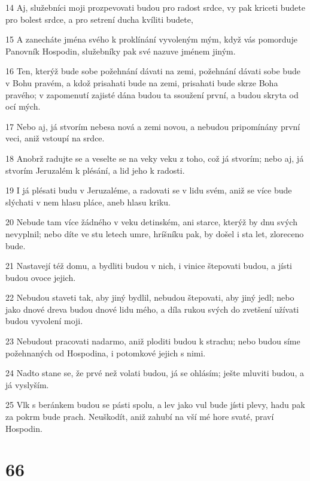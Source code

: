 \par 14 Aj, služebníci moji prozpevovati budou pro radost srdce, vy pak kriceti budete pro bolest srdce, a pro setrení ducha kvíliti budete,
\par 15 A zanecháte jména svého k proklínání vyvoleným mým, když vás pomorduje Panovník Hospodin, služebníky pak své nazuve jménem jiným.
\par 16 Ten, kterýž bude sobe požehnání dávati na zemi, požehnání dávati sobe bude v Bohu pravém, a kdož prisahati bude na zemi, prisahati bude skrze Boha pravého; v zapomenutí zajisté dána budou ta ssoužení první, a budou skryta od ocí mých.
\par 17 Nebo aj, já stvorím nebesa nová a zemi novou, a nebudou pripomínány první veci, aniž vstoupí na srdce.
\par 18 Anobrž radujte se a veselte se na veky veku z toho, což já stvorím; nebo aj, já stvorím Jeruzalém k plésání, a lid jeho k radosti.
\par 19 I já plésati budu v Jeruzaléme, a radovati se v lidu svém, aniž se více bude slýchati v nem hlasu pláce, aneb hlasu kriku.
\par 20 Nebude tam více žádného v veku detinském, ani starce, kterýž by dnu svých nevyplnil; nebo díte ve stu letech umre, hríšníku pak, by došel i sta let, zloreceno bude.
\par 21 Nastavejí též domu, a bydliti budou v nich, i vinice štepovati budou, a jísti budou ovoce jejich.
\par 22 Nebudou staveti tak, aby jiný bydlil, nebudou štepovati, aby jiný jedl; nebo jako dnové dreva budou dnové lidu mého, a díla rukou svých do zvetšení užívati budou vyvolení moji.
\par 23 Nebudout pracovati nadarmo, aniž ploditi budou k strachu; nebo budou síme požehnaných od Hospodina, i potomkové jejich s nimi.
\par 24 Nadto stane se, že prvé než volati budou, já se ohlásím; ješte mluviti budou, a já vyslyším.
\par 25 Vlk s beránkem budou se pásti spolu, a lev jako vul bude jísti plevy, hadu pak za pokrm bude prach. Neuškodít, aniž zahubí na vší mé hore svaté, praví Hospodin.

\chapter{66}

